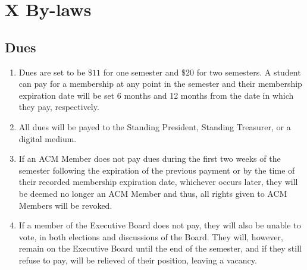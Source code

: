 \section{X \textendash{} By-laws}
\subsection{Dues}
\begin{enumerate}
  \item	Dues are set to be $\$11$ for one semester and $\$20$ for two semesters.
    A student can pay for a membership at any point in the semester and their
    membership expiration date will be set 6 months and 12 months from the date
    in which they pay, respectively.
  \item	All dues will be payed to the Standing President, Standing Treasurer, or
    a digital medium.
  \item If an ACM Member does not pay dues during the first two weeks of the
    semester following the expiration of the previous payment or by the time of
    their recorded membership expiration date, whichever occurs later, they will
    be deemed no longer an ACM Member and thus, all rights given to ACM Members
    will be revoked.
  \item If a member of the Executive Board does not pay, they will also be
    unable to vote, in both elections and discussions of the Board. They will,
    however, remain on the Executive Board until the end of the semester, and if
    they still refuse to pay, will be relieved of their position, leaving a
    vacancy.
\end{enumerate}
